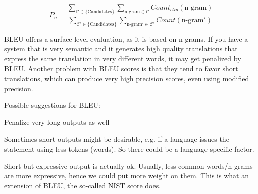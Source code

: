 \documentclass[12pt]{article}
\begin{document}
\[ P_n = \frac
{\sum\limits_{\mathcal{C}\in\{\text{Candidates}\}}
\sum\limits_{\text{n-gram}\in\mathcal{C}}
Count_{clip} (\text{n-gram})}
{\sum\limits_{\mathcal{C'}\in\{\text{Candidates}\}}
\sum\limits_{\text{n-gram}'\in\mathcal{C'}}
Count (\text{n-gram}')} \]
\par BLEU offers a surface-level evaluation, as it is based on n-grams. If you have a system that is very semantic and it generates high quality translations that express the same translation in very different words, it may get penalized by BLEU. Another problem with BLEU scores is that they tend to favor short translations, which can produce very high precision scores, even using modified precision.
\par Possible suggestions for BLEU:
\ulb
\item Penalize very long outputs as well
\item Sometimes short outputs might be desirable, e.g. if a language issues the statement using less tokens (words). So there could be a language-specific factor.
\item Short but expressive output is actually ok. Usually, less common words/n-grams are more expressive, hence we could put more weight on them. This is what an extension of BLEU, the so-called NIST score does.
\ule
\end{document}

